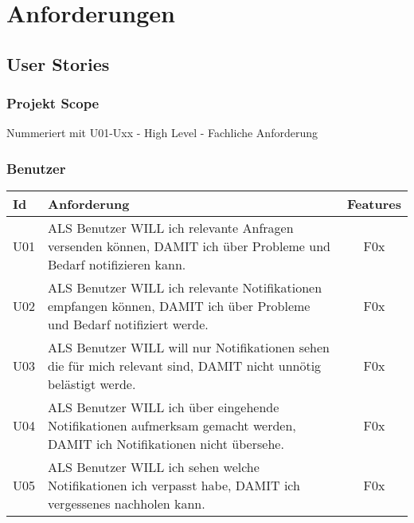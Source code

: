 \section{Anforderungen}\label{sec:anforderungen}

\subsection{User Stories}\label{subsec:user-stories}

\subsubsection*{Projekt Scope}


Nummeriert mit U01-Uxx - High Level - Fachliche Anforderung

\subsubsection*{Benutzer}

\begin{table}[h]
    \centering
    \begin{tabular}{|l|p{13cm}|c|}
        \hline
        \textbf{Id} & \textbf{Anforderung}                                                                                                     & \textbf{Features} \\
        \hline
        U01         & ALS Benutzer WILL ich relevante Anfragen versenden können, DAMIT ich über Probleme und Bedarf notifizieren kann. & F0x \\
        \hline
        U02         & ALS Benutzer WILL ich relevante Notifikationen empfangen können, DAMIT ich über Probleme und Bedarf notifiziert werde. & F0x \\
        \hline
        U03         & ALS Benutzer WILL will nur Notifikationen sehen die für mich relevant sind, DAMIT nicht unnötig belästigt werde. & F0x \\
        \hline
        U04         & ALS Benutzer WILL ich über eingehende Notifikationen aufmerksam gemacht werden, DAMIT ich Notifikationen nicht übersehe. & F0x \\
        \hline
        U05         & ALS Benutzer WILL ich sehen welche Notifikationen ich verpasst habe, DAMIT ich vergessenes nachholen kann. & F0x \\
        \hline
    \end{tabular}\label{tab:userstories1}
\end{table}

